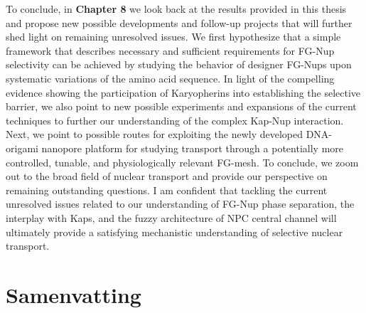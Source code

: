\noindent To conclude, in \textbf{Chapter 8} we look back at the results provided in this thesis and propose new possible developments and follow-up projects that will further shed light on remaining unresolved issues. We first hypothesize that a simple framework that describes necessary and sufficient requirements for FG-Nup selectivity can be achieved by studying the behavior of designer FG-Nups upon systematic variations of the amino acid sequence. In light of the compelling evidence showing the participation of Karyopherins into establishing the selective barrier, we also point to new possible experiments and expansions of the current techniques to further our understanding of the complex Kap-Nup interaction. Next, we point to possible routes for exploiting the newly developed DNA-origami nanopore platform for studying transport through a potentially more controlled, tunable, and physiologically relevant FG-mesh. To conclude, we zoom out to the broad field of nuclear transport and provide our perspective on remaining outstanding questions. I am confident that tackling the current unresolved issues related to our understanding of FG-Nup phase separation, the interplay with Kaps, and the fuzzy architecture of NPC central channel will ultimately provide a satisfying mechanistic understanding of selective nuclear transport.

\chapter*{Samenvatting}

